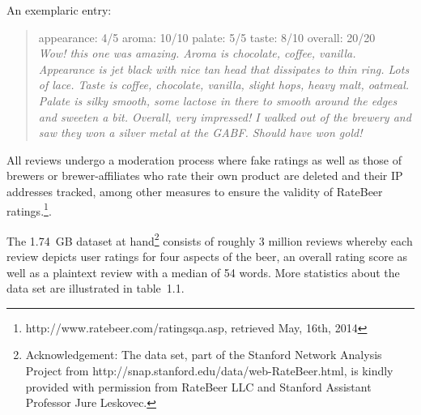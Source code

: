 \documentclass[11pt,titlepage,oneside,openany]{book}
\begin{document}
An exemplaric entry: \\
\begin{quote}
appearance: 4/5
aroma: 10/10
palate: 5/5
taste: 8/10
overall: 20/20 \\
\emph{Wow! this one was amazing.  Aroma is chocolate, coffee, vanilla.  Appearance is jet black with nice tan head that dissipates to thin ring.  Lots of lace.  Taste is coffee, chocolate, vanilla, slight hops, heavy malt, oatmeal.  Palate is silky smooth, some lactose in there to smooth around the edges and sweeten a bit.  Overall, very impressed! I walked out of the brewery and saw they won a silver metal at the GABF.  Should have won gold!}
\end{quote}


All reviews undergo a moderation process where fake ratings as well as those of brewers or brewer-affiliates who rate their own product are deleted and their IP addresses tracked, among other measures to ensure the validity of RateBeer ratings.\footnote{http://www.ratebeer.com/ratingsqa.asp, retrieved May, 16th, 2014}. 

The 1.74~GB dataset at hand\footnote{Acknowledgement: The data set, part of the Stanford Network Analysis Project from http://snap.stanford.edu/data/web-RateBeer.html, is kindly provided with permission from RateBeer LLC and Stanford Assistant Professor Jure Leskovec.} consists of roughly 3 million reviews whereby each review depicts user ratings for four aspects of the beer, an overall rating score as well as a plaintext review with a median of 54 words. More statistics about the data set are illustrated in table~1.1. 
\end{document}
